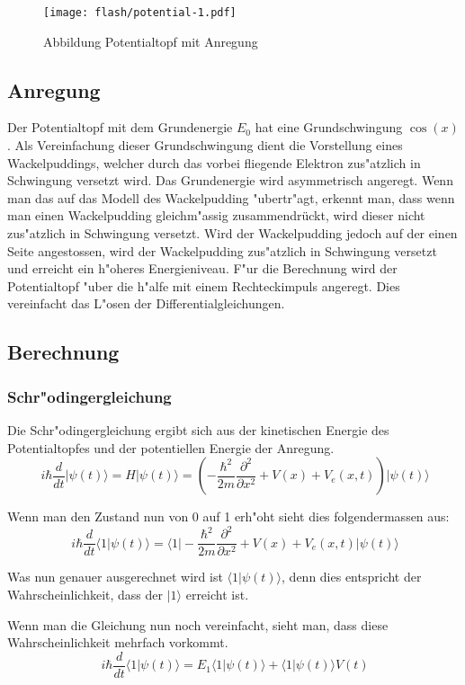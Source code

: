 \begin{refsection}
\begin{figure}
\centering
\texttt{[image: flash/potential-1.pdf]}
\caption{{Abbildung Potentialtopf mit Anregung}
\label{skript:PotAnregung}}
\end{figure}

\subsection{Anregung}
Der Potentialtopf mit dem Grundenergie $E_{0}$ hat eine Grundschwingung
$\cos(x)$.  Als Vereinfachung dieser Grundschwingung dient die
Vorstellung eines Wackelpuddings, welcher durch das vorbei fliegende
Elektron zus"atzlich in Schwingung versetzt wird.  Das Grundenergie
wird asymmetrisch angeregt. Wenn man das auf das Modell des
Wackelpudding "ubertr"agt, erkennt man, dass wenn man einen Wackelpudding
gleichm"assig zusammendrückt, wird dieser nicht zus"atzlich in Schwingung
versetzt. Wird der Wackelpudding jedoch auf der einen Seite angestossen,
wird der Wackelpudding zus"atzlich in Schwingung versetzt und erreicht
ein h"oheres Energieniveau.  F"ur die Berechnung wird der Potentialtopf
"uber die h"alfe mit einem Rechteckimpuls angeregt. Dies vereinfacht
das L"osen der Differentialgleichungen.

\subsection{Berechnung}
\subsubsection{Schr"odingergleichung}

Die Schr"odingergleichung ergibt sich aus der kinetischen Energie des
Potentialtopfes und der potentiellen Energie der Anregung.
\[
\ i\hbar\frac{d}{dt}|\psi(t)\rangle = H|\psi(t)\rangle = (-\frac{\hbar^2}{2m} \frac{\partial^2}{\partial x^2}+V(x)+V_{e}(x,t))|\psi(t)\rangle
\]

Wenn man den Zustand nun von 0 auf 1 erh"oht sieht dies folgendermassen aus:
\[
\ i\hbar\frac{d}{dt}\langle1|\psi(t)\rangle = \langle1|-\frac{\hbar^2}{2m} \frac{\partial^2}{\partial x^2}+V(x)+V_{e}(x,t)|\psi(t)\rangle
\]

Was nun genauer ausgerechnet wird ist $\langle1|\psi(t)\rangle$, denn
dies entspricht der Wahrscheinlichkeit, dass der $|1\rangle$ erreicht ist.

Wenn man die Gleichung nun noch vereinfacht, sieht man, dass diese
Wahrscheinlichkeit mehrfach vorkommt.
\[
\ i\hbar\frac{d}{dt}\langle1|\psi(t)\rangle = E_{1}\langle1|\psi(t)\rangle+\langle1|\psi(t)\rangle V(t)
\]


\end{refsection}
